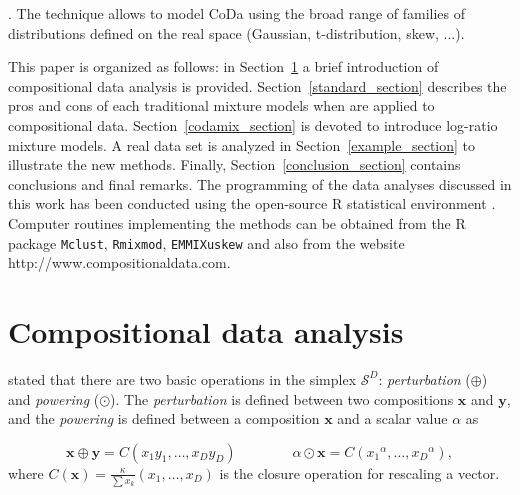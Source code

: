 \documentclass[12pt, a4paper]{article}
\begin{document}
. The technique allows to model CoDa using the broad range of families of distributions defined on the real space (Gaussian, t-distribution, skew, ...).

This paper is organized as follows: in Section~\ref{coda_section} a brief introduction of compositional data analysis is provided. Section~\ref{standard_section} describes the pros and cons of each traditional mixture models when are applied to compositional data. Section~\ref{codamix_section} is devoted to introduce log-ratio mixture models. A real data set is analyzed in Section~\ref{example_section} to illustrate the new methods. Finally, Section~\ref{conclusion_section} contains conclusions and final remarks. The programming of the data analyses discussed in this work has been conducted using the open-source R statistical environment \citep{R2014soft}. Computer routines implementing the methods can be obtained from the R package \texttt{Mclust}, \texttt{Rmixmod}, \texttt{EMMIXuskew} and also from the website http://www.compositionaldata.com.






\section{Compositional data analysis}
\label{coda_section}


 \noindent \cite{aitchison1986statistical} stated that  there are two basic operations in the simplex $\mathcal{S}^D$: \emph{perturbation} ($\oplus$) and 
 \emph{powering} ($\odot$). The \emph{perturbation} is defined between two compositions $\textbf{x}$ 
and $\textbf{y}$,  and the \emph{powering} is defined between a composition $\textbf{x}$ and a scalar value $\alpha$ as

\begin{equation}
\textbf{x} \oplus \textbf{y} =  C( x_1 y_1, \dots, x_D y_D) \qquad\qquad \alpha
 \odot \textbf{x} =  C( {x_1}^\alpha, \dots, {x_D}^\alpha),
\label{pert_pow}
\end{equation}
where $C(\textbf{x})=\frac{\kappa}{\sum x_k}(x_1, \dots, x_D) $ is the closure operation for rescaling a vector.
\end{document}
